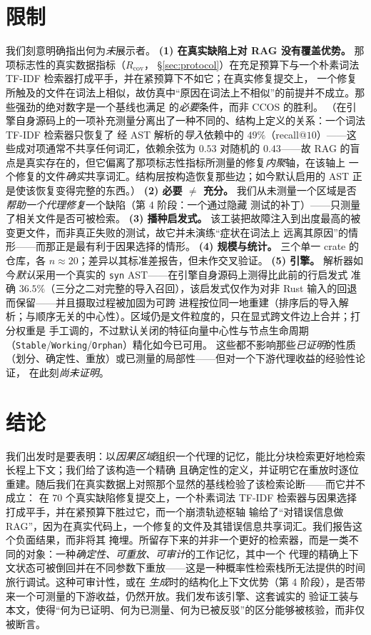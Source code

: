 \documentclass[11pt]{ctexart}
\newcommand{\code}[1]{\texttt{#1}}
\begin{document}
\section{限制}

我们刻意明确指出何为\emph{未}展示者。
\textbf{(1) 在真实缺陷上对 RAG 没有覆盖优势。} 那项标志性的真实数据指标（$R_{\mathrm{cov}}$，
\S\ref{sec:protocol}）在充足预算下与一个朴素词法 TF-IDF 检索器打成平手，并在紧预算下不如它；在真实修复提交上，
一个修复所触及的文件在词法上相似，故仿真中“原因在词法上不相似”的前提并不成立。那些强劲的绝对数字是一个基线也满足
的\emph{必要}条件，而非 CCOS 的胜利。
（在引擎自身源码上的一项补充测量分离出了一种不同的、结构上定义的关系：一个词法 TF-IDF 检索器只恢复了
经 AST 解析的\emph{导入}依赖中的 $49\%$（recall@$10$）——这些成对项通常不共享任何词汇，依赖余弦为 $0.53$
对随机的 $0.43$——故 RAG 的盲点是真实存在的，但它偏离了那项标志性指标所测量的修复\emph{内聚}轴，在该轴上
一个修复的文件\emph{确实}共享词汇。结构层按构造恢复那些边；如今默认启用的 AST 正是使该恢复变得完整的东西。）
\textbf{(2) 必要 $\neq$ 充分。} 我们从未测量一个区域是否\emph{帮助一个代理修复}一个缺陷（第 4 阶段：一个通过隐藏
测试的补丁）——只测量了相关文件是否可被检索。
\textbf{(3) 播种启发式。} 该工装把故障注入到出度最高的被变更文件，而非真正失败的测试，故它并未演练“症状在词法上
远离其原因”的情形——而那正是最有利于因果选择的情形。
\textbf{(4) 规模与统计。} 三个单一 crate 的仓库，各 $n\!\approx\!20$；差异以其标准差报告，但未作交叉验证。
\textbf{(5) 引擎。} 解析器如今\emph{默认}采用一个真实的 \code{syn} AST——在引擎自身源码上测得比此前的行启发式
准确 $36.5\%$（三分之二对完整的导入召回），该启发式仅作为对非 Rust 输入的回退而保留——并且摄取过程被加固为可跨
进程按位同一地重建（排序后的导入解析；与顺序无关的中心性）。区域仍是文件粒度的，只在显式跨文件边上合并；打分权重是
手工调的，不过默认关闭的特征向量中心性与节点生命周期（\code{Stable}/\code{Working}/\code{Orphan}）精化如今已可用。
这些都不影响那些\emph{已证明}的性质（划分、确定性、重放）或已测量的局部性——但对一个下游代理收益的经验性论证，
在此刻\emph{尚未证明}。

\section{结论}

我们出发时是要表明：以\emph{因果区域}组织一个代理的记忆，能比分块检索更好地检索长程上下文；我们给了该构造一个精确
且确定性的定义，并证明它在重放时逐位重建。随后我们在真实数据上对照那个显然的基线检验了该检索论断——而它并不成立：
在 $70$ 个真实缺陷修复提交上，一个朴素词法 TF-IDF 检索器与因果选择打成平手，并在紧预算下胜过它，而一个崩溃轨迹枢轴
输给了“对错误信息做 RAG”，因为在真实代码上，一个修复的文件及其错误信息共享词汇。我们报告这个负面结果，而非将其
掩埋。所留存下来的并非一个更好的检索器，而是一类不同的对象：一种\emph{确定性、可重放、可审计}的工作记忆，其中一个
代理的精确上下文状态可被倒回并在不同参数下重放——这是一种概率性检索栈所无法提供的时间旅行调试。这种可审计性，或在
\emph{生成}时的结构化上下文优势（第 4 阶段），是否带来一个可测量的下游收益，仍然开放。我们发布该引擎、这套诚实的
验证工装与本文，使得“何为已证明、何为已测量、何为已被反驳”的区分能够被核验，而非仅被断言。
\end{document}
